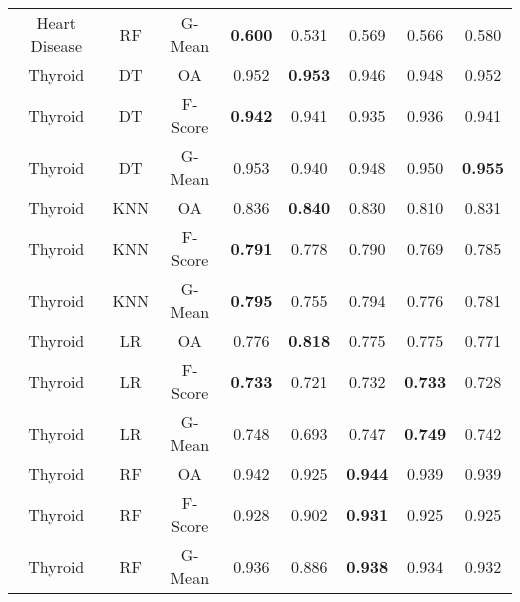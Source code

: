 \begin{longtable}{cccccccc}
  Heart Disease &         RF &  G-Mean & \textbf{0.600} &          0.531 &          0.569 &          0.566 &          0.580 \\
        Thyroid &         DT &      OA &          0.952 & \textbf{0.953} &          0.946 &          0.948 &          0.952 \\
        Thyroid &         DT & F-Score & \textbf{0.942} &          0.941 &          0.935 &          0.936 &          0.941 \\
        Thyroid &         DT &  G-Mean &          0.953 &          0.940 &          0.948 &          0.950 & \textbf{0.955} \\
        Thyroid &        KNN &      OA &          0.836 & \textbf{0.840} &          0.830 &          0.810 &          0.831 \\
        Thyroid &        KNN & F-Score & \textbf{0.791} &          0.778 &          0.790 &          0.769 &          0.785 \\
        Thyroid &        KNN &  G-Mean & \textbf{0.795} &          0.755 &          0.794 &          0.776 &          0.781 \\
        Thyroid &         LR &      OA &          0.776 & \textbf{0.818} &          0.775 &          0.775 &          0.771 \\
        Thyroid &         LR & F-Score & \textbf{0.733} &          0.721 &          0.732 & \textbf{0.733} &          0.728 \\
        Thyroid &         LR &  G-Mean &          0.748 &          0.693 &          0.747 & \textbf{0.749} &          0.742 \\
        Thyroid &         RF &      OA &          0.942 &          0.925 & \textbf{0.944} &          0.939 &          0.939 \\
        Thyroid &         RF & F-Score &          0.928 &          0.902 & \textbf{0.931} &          0.925 &          0.925 \\
        Thyroid &         RF &  G-Mean &          0.936 &          0.886 & \textbf{0.938} &          0.934 &          0.932 \\
\end{longtable}
